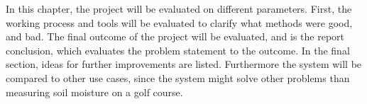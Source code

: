 In this chapter, the project will be evaluated on different parameters. First, the working process and tools will be evaluated to clarify what methods were good, and bad. The final outcome of the project will be evaluated, and is the report conclusion, which evaluates the problem statement to the outcome. In the final section, ideas for further improvements are listed. Furthermore the system will be compared to other use cases, since the system might solve other problems than measuring soil moisture on a golf course.